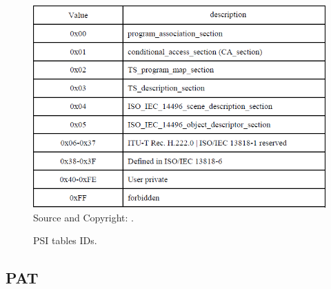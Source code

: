 \documentclass[
	12pt,				%
	openright,			%
	twoside,			%
	a4paper,			%
	brazil,
	french,				%
	english
	]{abntex2}
\begin{document}
\begin{figure}[!hb]
\centering
\caption{PSI tables IDs.}
\includegraphics[width=1\linewidth]{figuras/tab_psi_tables_ids.png}
\\Source and Copyright: .
\label{fig:tab_psi_tables_ids}
\end{figure}


\subsection{PAT}
\end{document}
